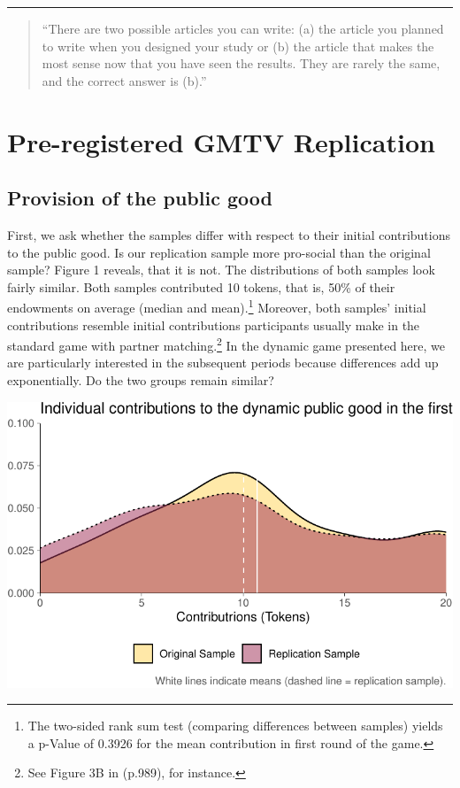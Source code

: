 \documentclass[
  authoryear,
  preprint,
  3p]{elsarticle}
\begin{document}
\begin{center}\rule{0.5\linewidth}{0.5pt}\end{center}

\begin{quote}
``There are two possible articles you can write: (a) the article you
planned to write when you designed your study or (b) the article that
makes the most sense now that you have seen the results. They are rarely
the same, and the correct answer is (b).'' \citep[p.~171]{bemwriting}
\end{quote}

\hypertarget{pre-registered-gmtv-replication}{%
\section{Pre-registered GMTV
Replication}\label{pre-registered-gmtv-replication}}

\hypertarget{provision-of-the-public-good}{%
\subsection{Provision of the public
good}\label{provision-of-the-public-good}}

First, we ask whether the samples differ with respect to their initial
contributions to the public good. Is our replication sample more
pro-social than the original sample? Figure 1 reveals, that it is not.
The distributions of both samples look fairly similar. Both samples
contributed 10 tokens, that is, 50\% of their endowments on average
(median and mean).\footnote{The two-sided rank sum test (comparing
  differences between samples) yields a p-Value of 0.3926 for the mean
  contribution in first round of the game.} Moreover, both samples'
initial contributions resemble initial contributions participants
usually make in the standard game with partner matching.\footnote{See
  Figure 3B in \citet{fehrgaechter2000} (p.989), for instance.} In the
dynamic game presented here, we are particularly interested in the
subsequent periods because differences add up exponentially. Do the two
groups remain similar?

\includegraphics{paper_files/figure-pdf/firstRoundViz-1.pdf}
\end{document}

